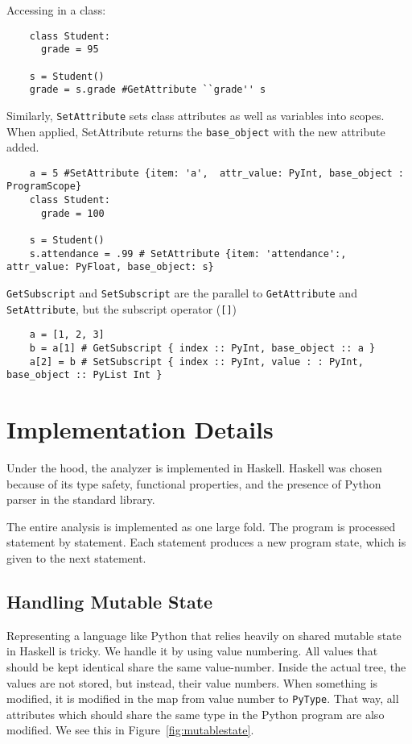 \documentclass{article}[12pt]
\begin{document}
Accessing in a class:
\begin{verbatim}
    class Student:
      grade = 95

    s = Student()
    grade = s.grade #GetAttribute ``grade'' s
\end{verbatim}

Similarly, \verb=SetAttribute= sets class attributes as well as variables into scopes. When applied,
SetAttribute returns the \verb=base_object= with the new attribute added.

\begin{verbatim}
    a = 5 #SetAttribute {item: 'a',  attr_value: PyInt, base_object : ProgramScope}
    class Student:
      grade = 100

    s = Student()
    s.attendance = .99 # SetAttribute {item: 'attendance':, attr_value: PyFloat, base_object: s}
\end{verbatim}

\verb=GetSubscript= and \verb=SetSubscript= are the parallel to \verb=GetAttribute= and
\verb=SetAttribute=, but the subscript operator (\verb=[]=)

\begin{verbatim}
    a = [1, 2, 3]
    b = a[1] # GetSubscript { index :: PyInt, base_object :: a }
    a[2] = b # SetSubscript { index :: PyInt, value : : PyInt, base_object :: PyList Int }
\end{verbatim}

\section{Implementation Details}

Under the hood, the analyzer is implemented in Haskell. Haskell was chosen because of its type
safety, functional properties, and the presence of Python parser in the standard library. 

The entire analysis is implemented as one large fold. The program is processed statement by statement. Each
statement produces a new program state, which is given to the next statement.

\subsection{Handling Mutable State}
Representing a language like Python that relies heavily on shared mutable state in Haskell is
tricky. We handle it by using value numbering. All values that should be kept identical share the
same value-number. Inside the actual tree, the values are not stored, but instead, their value
numbers. When something is modified, it is modified in the map from value number to \verb=PyType=.
That way, all attributes which should share the same type in the Python program are also modified.
We see this in Figure~\ref{fig:mutablestate}.
\end{document}
